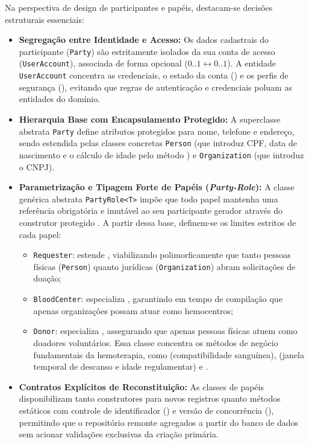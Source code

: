 Na perspectiva de design de participantes e papéis, destacam-se decisões estruturais essenciais:
\begin{itemize}[leftmargin=*]
  \item \textbf{Segregação entre Identidade e Acesso:} Os dados cadastrais do participante (\texttt{Party}) são estritamente isolados da sua conta de acesso (\texttt{UserAccount}), associada de forma opcional ($0..1 \leftrightarrow 0..1$). A entidade \texttt{UserAccount} concentra as credenciais, o estado da conta () e os perfis de segurança (), evitando que regras de autenticação e credenciais poluam as entidades do domínio.
  \item \textbf{Hierarquia Base com Encapsulamento Protegido:} A superclasse abstrata \texttt{Party} define atributos protegidos para nome, telefone e endereço, sendo estendida pelas classes concretas \texttt{Person} (que introduz CPF, data de nascimento e o cálculo de idade pelo método ) e \texttt{Organization} (que introduz o CNPJ).
  \item \textbf{Parametrização e Tipagem Forte de Papéis (\textit{Party-Role}):} A classe genérica abstrata \texttt{PartyRole<T>} impõe que todo papel mantenha uma referência obrigatória e imutável ao seu participante gerador através do construtor protegido . A partir dessa base, definem-se os limites estritos de cada papel:
  \begin{itemize}
    \item \texttt{Requester}: estende , viabilizando polimorficamente que tanto pessoas físicas (\texttt{Person}) quanto jurídicas (\texttt{Organization}) abram solicitações de doação;
    \item \texttt{BloodCenter}: especializa , garantindo em tempo de compilação que apenas organizações possam atuar como hemocentros;
    \item \texttt{Donor}: especializa , assegurando que apenas pessoas físicas atuem como doadores voluntários. Essa classe concentra os métodos de negócio fundamentais da hemoterapia, como  (compatibilidade sanguínea),  (janela temporal de descanso e idade regulamentar) e .
  \end{itemize}
  \item \textbf{Contratos Explícitos de Reconstituição:} As classes de papéis disponibilizam tanto construtores para novos registros quanto métodos estáticos  com controle de identificador () e versão de concorrência (), permitindo que o repositório remonte agregados a partir do banco de dados sem acionar validações exclusivas da criação primária.
\end{itemize}

